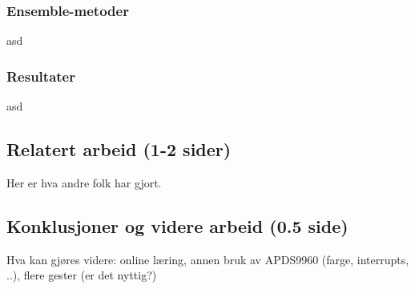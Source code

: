 \subsubsection{Ensemble-metoder}
asd

\subsubsection{Resultater}
asd

\subsection{Relatert arbeid (1-2 sider)}
Her er hva andre folk har gjort.

\subsection{Konklusjoner og videre arbeid (0.5 side)}
Hva kan gjøres videre: online læring, annen bruk av APDS9960 (farge, interrupts, ..), flere gester (er det nyttig?)





